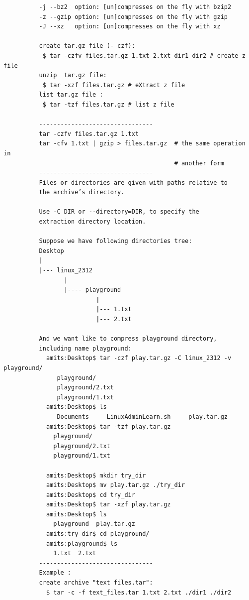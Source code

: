 \documentclass[a4paper,12pt]{article}
\begin{document}
\begin{verbatim}
          -j --bz2  option: [un]compresses on the fly with bzip2
          -z --gzip option: [un]compresses on the fly with gzip 
          -J --xz   option: [un]compresses on the fly with xz  
          
          create tar.gz file (- czf):
           $ tar -czfv files.tar.gz 1.txt 2.txt dir1 dir2 # create z file  
          unzip  tar.gz file:          
           $ tar -xzf files.tar.gz # eXtract z file
          list tar.gz file : 
           $ tar -tzf files.tar.gz # list z file        
          
          --------------------------------
          tar -czfv files.tar.gz 1.txt
          tar -cfv 1.txt | gzip > files.tar.gz  # the same operation in
                                                # another form
          --------------------------------                                   
          Files or directories are given with paths relative to 
          the archive’s directory.
          
          Use -C DIR or --directory=DIR, to specify the 
          extraction directory location.
          
          Suppose we have following directories tree:
          Desktop
          |          
          |--- linux_2312
                 |
                 |---- playground
                          |
                          |--- 1.txt
                          |--- 2.txt
                 
          And we want like to compress playground directory,
          including name playground:
            amits:Desktop$ tar -czf play.tar.gz -C linux_2312 -v playground/
               playground/
               playground/2.txt
               playground/1.txt
            amits:Desktop$ ls
               Documents     LinuxAdminLearn.sh     play.tar.gz
            amits:Desktop$ tar -tzf play.tar.gz
              playground/
              playground/2.txt
              playground/1.txt
            
            amits:Desktop$ mkdir try_dir 
            amits:Desktop$ mv play.tar.gz ./try_dir
            amits:Desktop$ cd try_dir
            amits:Desktop$ tar -xzf play.tar.gz
            amits:Desktop$ ls
              playground  play.tar.gz 
            amits:try_dir$ cd playground/
            amits:playground$ ls
              1.txt  2.txt
          --------------------------------
          Example : 
          create archive "text files.tar": 
            $ tar -c -f text_files.tar 1.txt 2.txt ./dir1 ./dir2
            

\end{verbatim}
\end{document}
